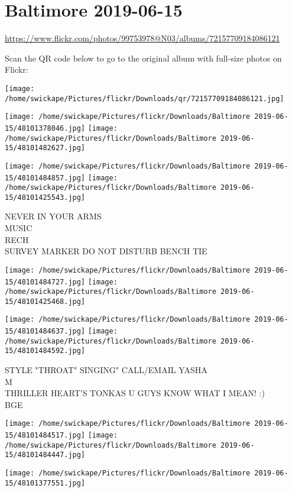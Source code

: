 \documentclass[10pt,letterpaper]{article}
\begin{document}
\section*{Baltimore 2019-06-15}

\url{https://www.flickr.com/photos/99753978@N03/albums/72157709184086121}

Scan the QR code below to go to the original album with full-size photos on Flickr:

\texttt{[image: /home/swickape/Pictures/flickr/Downloads/qr/72157709184086121.jpg]}
\pagebreak

\texttt{[image: /home/swickape/Pictures/flickr/Downloads/Baltimore 2019-06-15/48101378046.jpg]}
\texttt{[image: /home/swickape/Pictures/flickr/Downloads/Baltimore 2019-06-15/48101482627.jpg]}

\texttt{[image: /home/swickape/Pictures/flickr/Downloads/Baltimore 2019-06-15/48101484857.jpg]}
\texttt{[image: /home/swickape/Pictures/flickr/Downloads/Baltimore 2019-06-15/48101425543.jpg]}

NEVER IN YOUR ARMS\\
MUSIC\\
RECH\\
SURVEY MARKER DO NOT DISTURB BENCH TIE
\pagebreak

\texttt{[image: /home/swickape/Pictures/flickr/Downloads/Baltimore 2019-06-15/48101484727.jpg]}
\texttt{[image: /home/swickape/Pictures/flickr/Downloads/Baltimore 2019-06-15/48101425468.jpg]}

\texttt{[image: /home/swickape/Pictures/flickr/Downloads/Baltimore 2019-06-15/48101484637.jpg]}
\texttt{[image: /home/swickape/Pictures/flickr/Downloads/Baltimore 2019-06-15/48101484592.jpg]}

STYLE "THROAT" SINGING" CALL/EMAIL YASHA\\
M\\
THRILLER HEART'S TONKAS U GUYS KNOW WHAT I MEAN!  :)\\
BGE
\pagebreak

\texttt{[image: /home/swickape/Pictures/flickr/Downloads/Baltimore 2019-06-15/48101484517.jpg]}
\texttt{[image: /home/swickape/Pictures/flickr/Downloads/Baltimore 2019-06-15/48101484447.jpg]}

\vspace{0.25in}
\texttt{[image: /home/swickape/Pictures/flickr/Downloads/Baltimore 2019-06-15/48101377551.jpg]}
\end{document}
